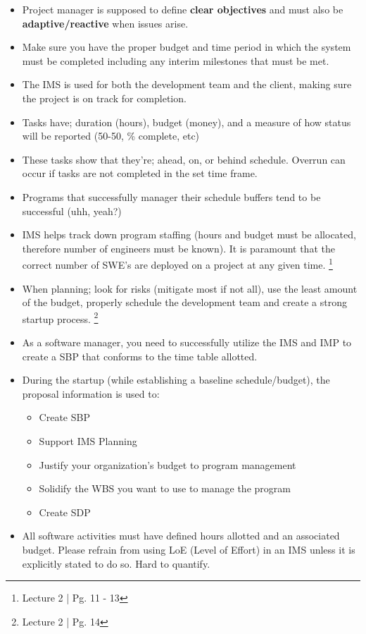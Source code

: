 \documentclass{article}
\begin{document}
\begin{itemize}

\item Project manager is supposed to define \textbf{clear objectives} and must also be \textbf{adaptive/reactive} when issues arise.
\item Make sure you have the proper budget and time period in which the system must be completed including any interim milestones that must be met.
\item The IMS is used for both the development team and the client, making sure the project is on track for completion.
\item Tasks have; duration (hours), budget (money), and a measure of how status will be reported (50-50, \% complete, etc)
\item These tasks show that they're; ahead, on, or behind schedule. Overrun can occur if tasks are not completed in the set time frame.
\item Programs that successfully manager their schedule buffers tend to be successful (uhh, yeah?)
\item IMS helps track down program staffing (hours and budget must be allocated, therefore number of engineers must be known). It is paramount that the correct number of SWE's are deployed on a project at any given time. \footnote{Lecture 2 | Pg. 11 - 13}
\item When planning; look for risks (mitigate most if not all), use the least amount of the budget, properly schedule the development team and create a strong startup process. \footnote{Lecture 2 | Pg. 14}
\item As a software manager, you need to successfully utilize the IMS and IMP to create a SBP that conforms to the time table allotted.
\item During the startup (while establishing a baseline schedule/budget), the proposal information is used to:

\begin{itemize}

\item Create SBP
\item Support IMS Planning
\item Justify your organization's budget to program management
\item Solidify the WBS you want to use to manage the program
\item Create SDP

\end{itemize}
\item All software activities must have defined hours allotted and an associated budget. Please refrain from using LoE (Level of Effort) in an IMS unless it is explicitly stated to do so. Hard to quantify.

\end{itemize}
\end{document}
